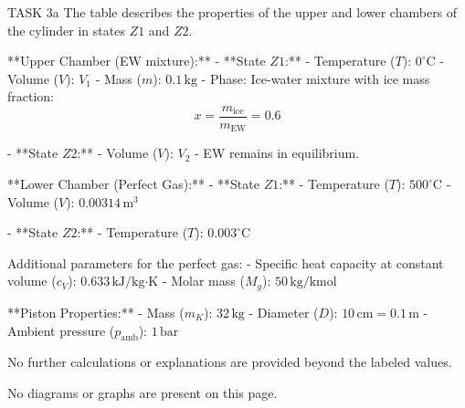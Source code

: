TASK 3a  
The table describes the properties of the upper and lower chambers of the cylinder in states \( Z1 \) and \( Z2 \).  

**Upper Chamber (EW mixture):**  
- **State \( Z1 \):**  
  - Temperature (\( T \)): \( 0^\circ\text{C} \)  
  - Volume (\( V \)): \( V_1 \)  
  - Mass (\( m \)): \( 0.1 \, \text{kg} \)  
  - Phase: Ice-water mixture with ice mass fraction:  
    \[
    x = \frac{m_{\text{ice}}}{m_{\text{EW}}} = 0.6
    \]  

- **State \( Z2 \):**  
  - Volume (\( V \)): \( V_2 \)  
  - EW remains in equilibrium.  

**Lower Chamber (Perfect Gas):**  
- **State \( Z1 \):**  
  - Temperature (\( T \)): \( 500^\circ\text{C} \)  
  - Volume (\( V \)): \( 0.00314 \, \text{m}^3 \)  

- **State \( Z2 \):**  
  - Temperature (\( T \)): \( 0.003^\circ\text{C} \)  

Additional parameters for the perfect gas:  
- Specific heat capacity at constant volume (\( c_V \)): \( 0.633 \, \text{kJ/kg·K} \)  
- Molar mass (\( M_g \)): \( 50 \, \text{kg/kmol} \)  

**Piston Properties:**  
- Mass (\( m_K \)): \( 32 \, \text{kg} \)  
- Diameter (\( D \)): \( 10 \, \text{cm} = 0.1 \, \text{m} \)  
- Ambient pressure (\( p_{\text{amb}} \)): \( 1 \, \text{bar} \)  

No further calculations or explanations are provided beyond the labeled values.  

No diagrams or graphs are present on this page.